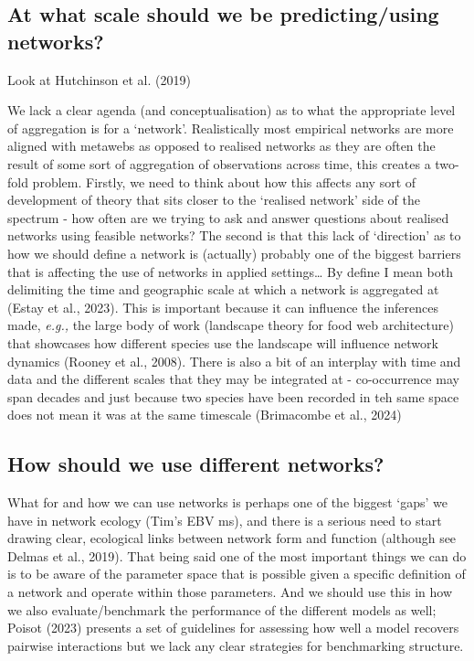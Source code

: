 \documentclass[
]{article}
\begin{document}
\subsection{At what scale should we be predicting/using
networks?}\label{at-what-scale-should-we-be-predictingusing-networks}

Look at Hutchinson et al. (2019)

We lack a clear agenda (and conceptualisation) as to what the
appropriate level of aggregation is for a `network'. Realistically most
empirical networks are more aligned with metawebs as opposed to realised
networks as they are often the result of some sort of aggregation of
observations across time, this creates a two-fold problem. Firstly, we
need to think about how this affects any sort of development of theory
that sits closer to the `realised network' side of the spectrum - how
often are we trying to ask and answer questions about realised networks
using feasible networks? The second is that this lack of `direction' as
to how we should define a network is (actually) probably one of the
biggest barriers that is affecting the use of networks in applied
settings\ldots{} By define I mean both delimiting the time and
geographic scale at which a network is aggregated at (Estay et al.,
2023). This is important because it can influence the inferences made,
\emph{e.g.,} the large body of work (landscape theory for food web
architecture) that showcases how different species use the landscape
will influence network dynamics (Rooney et al., 2008). There is also a
bit of an interplay with time and data and the different scales that
they may be integrated at - co-occurrence may span decades and just
because two species have been recorded in teh same space does not mean
it was at the same timescale (Brimacombe et al., 2024)

\subsection{How should we use different
networks?}\label{how-should-we-use-different-networks}

What for and how we can use networks is perhaps one of the biggest
`gaps' we have in network ecology (Tim's EBV ms), and there is a serious
need to start drawing clear, ecological links between network form and
function (although see Delmas et al., 2019). That being said one of the
most important things we can do is to be aware of the parameter space
that is possible given a specific definition of a network and operate
within those parameters. And we should use this in how we also
evaluate/benchmark the performance of the different models as well;
Poisot (2023) presents a set of guidelines for assessing how well a
model recovers pairwise interactions but we lack any clear strategies
for benchmarking structure.
\end{document}
